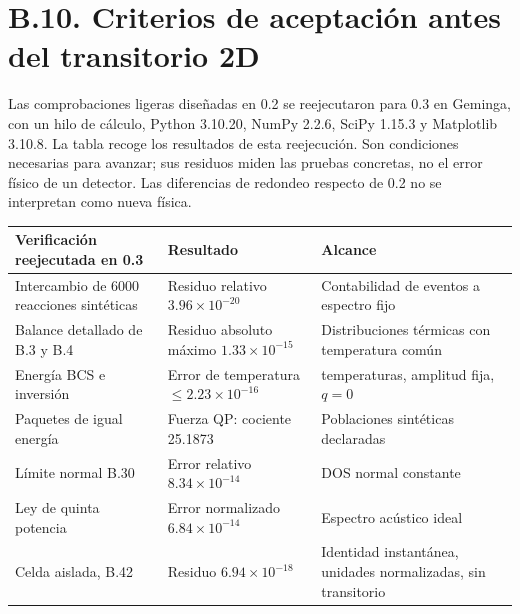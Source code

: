 \documentclass[
  spanish,
  10pt,
  a4paper,
]{article}
\newcounter{none} %
\begin{document}
\section{B.10. Criterios de aceptación antes del transitorio
2D}\label{b.10.-criterios-de-aceptaciuxf3n-antes-del-transitorio-2d}

Las comprobaciones ligeras diseñadas en 0.2 se reejecutaron para 0.3 en
Geminga, con un hilo de cálculo, Python 3.10.20, NumPy 2.2.6, SciPy
1.15.3 y Matplotlib 3.10.8. La tabla recoge los resultados de esta
reejecución. Son condiciones necesarias para avanzar; sus residuos miden
las pruebas concretas, no el error físico de un detector. Las
diferencias de redondeo respecto de 0.2 no se interpretan como nueva
física.

{\def\LTcaptype{none} %
\begin{longtable}[]{@{}
  >{\raggedright\arraybackslash}p{}
  >{\raggedright\arraybackslash}p{}
  >{\raggedright\arraybackslash}p{}@{}}
\toprule\noalign{}
\begin{minipage}[b]{\linewidth}\raggedright
Verificación reejecutada en 0.3
\end{minipage} & \begin{minipage}[b]{\linewidth}\raggedright
Resultado
\end{minipage} & \begin{minipage}[b]{\linewidth}\raggedright
Alcance
\end{minipage} \\
\midrule\noalign{}
\endhead
\bottomrule\noalign{}
\endlastfoot
Intercambio de 6000 reacciones sintéticas & Residuo relativo
\(3.96\times10^{-20}\) & Contabilidad de eventos a espectro fijo \\
Balance detallado de B.3 y B.4 & Residuo absoluto máximo
\(1.33\times10^{-15}\) & Distribuciones térmicas con temperatura
común \\
Energía BCS e inversión & Error de temperatura
\(\leq2.23\times10^{-16}\) & 220 temperaturas, amplitud fija, \(q=0\) \\
Paquetes de igual energía & Fuerza QP: cociente 25.1873 & Poblaciones
sintéticas declaradas \\
Límite normal B.30 & Error relativo \(8.34\times10^{-14}\) & DOS normal
constante \\
Ley de quinta potencia & Error normalizado \(6.84\times10^{-14}\) &
Espectro acústico ideal \\
Celda aislada, B.42 & Residuo \(6.94\times10^{-18}\) & Identidad
instantánea, unidades normalizadas, sin transitorio \\
\end{longtable}
}
\end{document}
